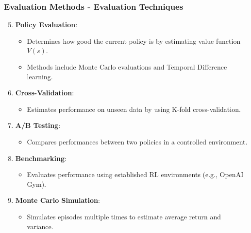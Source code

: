 \documentclass[aspectratio=169]{beamer}
\begin{document}
\begin{frame}[fragile]
    \frametitle{Evaluation Methods - Evaluation Techniques}
    \begin{enumerate}
        \setcounter{enumi}{4}
        \item \textbf{Policy Evaluation}:
        \begin{itemize}
            \item Determines how good the current policy is by estimating value function $V(s)$.
            \item Methods include Monte Carlo evaluations and Temporal Difference learning.
        \end{itemize}
        
        \item \textbf{Cross-Validation}:
        \begin{itemize}
            \item Estimates performance on unseen data by using K-fold cross-validation.
        \end{itemize}
        
        \item \textbf{A/B Testing}:
        \begin{itemize}
            \item Compares performances between two policies in a controlled environment.
        \end{itemize}
        
        \item \textbf{Benchmarking}:
        \begin{itemize}
            \item Evaluates performance using established RL environments (e.g., OpenAI Gym).
        \end{itemize}
        
        \item \textbf{Monte Carlo Simulation}:
        \begin{itemize}
            \item Simulates episodes multiple times to estimate average return and variance.
        \end{itemize}
    \end{enumerate}
\end{frame}
\end{document}
